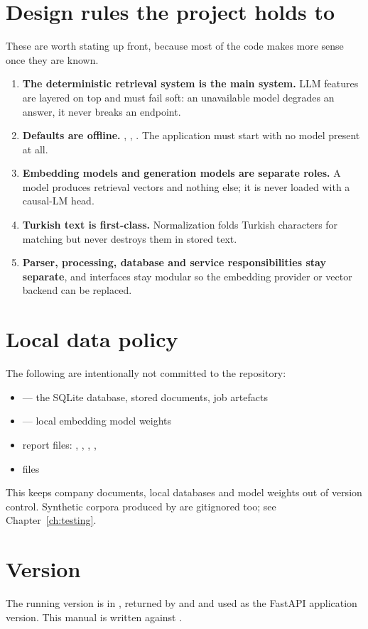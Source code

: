 \section{Design rules the project holds to}

These are worth stating up front, because most of the code makes more sense once
they are known.

\begin{enumerate}
\item \textbf{The deterministic retrieval system is the main system.} LLM
features are layered on top and must fail soft: an unavailable model degrades an
answer, it never breaks an endpoint.

\item \textbf{Defaults are offline.} ,
, . The application must
start with no model present at all.

\item \textbf{Embedding models and generation models are separate roles.} A
 model produces retrieval vectors and nothing else; it
is never loaded with a causal-LM head.

\item \textbf{Turkish text is first-class.} Normalization folds Turkish
characters for matching but never destroys them in stored text.

\item \textbf{Parser, processing, database and service responsibilities stay
separate}, and interfaces stay modular so the embedding provider or vector
backend can be replaced.
\end{enumerate}

\section{Local data policy}

The following are intentionally not committed to the repository:

\begin{itemize}
\item {} --- the SQLite database, stored documents, job artefacts
\item {} --- local embedding model weights
\item report files: , , , ,
\item {} files
\end{itemize}

This keeps company documents, local databases and model weights out of version
control. Synthetic corpora produced by
 are gitignored too; see
Chapter~\ref{ch:testing}.

\section{Version}

The running version is  in , returned by
 and  and used as the FastAPI
application version. This manual is written against \version.

